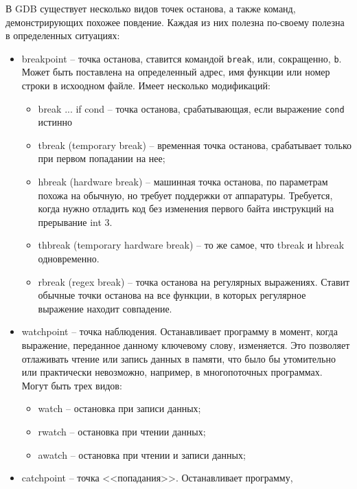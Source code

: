 В GDB существует несколько видов точек останова, а также команд, 
демонстрирующих похожее повдение. 
Каждая из них полезна по-своему полезна в определенных ситуациях:
\begin{itemize}
    \item breakpoint -- точка останова, ставится командой \verb|break|,
        или, сокращенно, \verb|b|. Может быть поставлена на определенный
        адрес, имя функции или номер строки в исхоодном файле.
        Имеет несколько модификаций:
        \begin{itemize}
            \item break ... if cond -- точка останова, срабатывающая,
                если выражение \verb|cond| истинно
            \item tbreak (temporary break) -- временная точка
                останова, срабатывает только при первом попадании на нее;
            \item hbreak (hardware break) -- машинная точка останова,
                по параметрам похожа на обычную, но требует поддержки
                от аппаратуры. Требуется, когда нужно отладить код
                без изменения первого байта инструкций на прерывание 
                int 3.
            \item thbreak (temporary hardware break) -- то же самое, что
                tbreak и hbreak одновременно.
            \item rbreak (regex break) -- точка останова на регулярных
                выражениях. Ставит обычные точки останова на все функции,
                в которых регулярное выражение находит совпадение.
        \end{itemize}
    \item watchpoint -- точка наблюдения. Останавливает программу в
        момент, когда выражение, переданное данному ключевому слову,
        изменяется. Это позволяет отлаживать чтение или запись данных в памяти,
        что было бы утомительно или практически невозможно, например,
        в многопоточных программах. Могут быть трех видов:
        \begin{itemize}
            \item watch -- остановка при записи данных;
            \item rwatch -- остановка при чтении данных;
            \item awatch -- остановка при чтении и записи данных;
        \end{itemize}
    \item catchpoint -- точка <<попадания>>. Останавливает программу,

\end{itemize}
